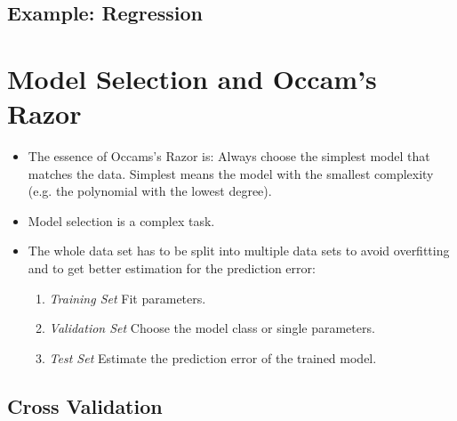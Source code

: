\documentclass[a4paper, 11pt, accentcolor = tud3b]{tudreport}
\begin{document}
			\subsection{Example: Regression} %

		\section{Model Selection and Occam's Razor}
			\label{sec:validation}

			\begin{itemize}
				\item The essence of Occams's Razor is: Always choose the simplest model that matches the data. Simplest means the model with the smallest complexity (e.g. the polynomial with the lowest degree).
				\item Model selection is a complex task.
				\item The whole data set has to be split into multiple data sets to avoid overfitting and to get better estimation for the prediction error:
					\begin{enumerate}
						\item \emph{Training Set}   \tabto{3cm} Fit parameters.
						\item \emph{Validation Set} \tabto{3cm} Choose the model class or single parameters.
						\item \emph{Test Set}       \tabto{3cm} Estimate the prediction error of the trained model.
					\end{enumerate}
			\end{itemize}

			\subsection{Cross Validation}
				\label{sec:crossvalidation}
\end{document}
